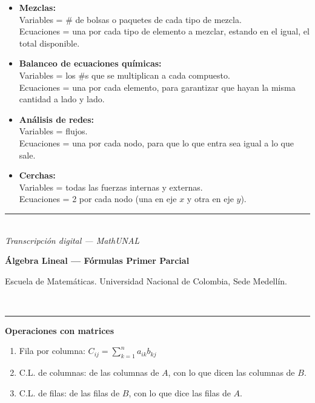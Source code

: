 \documentclass[11pt]{article}
\newcommand{\examheader}{%
  \noindent
  \begin{minipage}[t]{0.6\linewidth}
    {\small\bfseries Álgebra Lineal --- Fórmulas Primer Parcial}\\
  \end{minipage}%
  \hfill
  \begin{minipage}[t]{0.35\linewidth}
    \raggedleft\small Escuela de Matemáticas. Universidad Nacional de Colombia, Sede Medellín.
  \end{minipage}\\[2pt]
  \rule{\linewidth}{0.6pt}
}
\newcommand{\examfooter}{%
  \vfill
  \rule{\linewidth}{0.4pt}\\[1pt]
  {\scriptsize\textit{Transcripción digital --- MathUNAL}\hfill\textcolor{unalblue}{\textbf{\thepage}}}
}
\begin{document}
\begin{itemize}[leftmargin=1.2em]
\item \textbf{Mezclas:}\\
Variables = \# de bolsas o paquetes de cada tipo de mezcla.\\
Ecuaciones = una por cada tipo de elemento a mezclar, estando en el igual, el total disponible.

\vspace{0.2cm}
\item \textbf{Balanceo de ecuaciones químicas:}\\
Variables = los \#s que se multiplican a cada compuesto.\\
Ecuaciones = una por cada elemento, para garantizar que hayan la misma cantidad a lado y lado.

\vspace{0.2cm}
\item \textbf{Análisis de redes:}\\
Variables = flujos.\\
Ecuaciones = una por cada nodo, para que lo que entra sea igual a lo que sale.

\vspace{0.2cm}
\item \textbf{Cerchas:}\\
Variables = todas las fuerzas internas y externas.\\
Ecuaciones = 2 por cada nodo (una en eje $x$ y otra en eje $y$).
\end{itemize}

\examfooter
\newpage

\examheader

\begin{center}
{\bfseries\large Operaciones con matrices}
\end{center}

\begin{enumerate}
\item Fila por columna: $C_{ij} = \displaystyle\sum_{k=1}^{n} a_{ik}b_{kj}$
\item C.L. de columnas: de las columnas de $A$, con lo que dicen las columnas de $B$.
\item C.L. de filas: de las filas de $B$, con lo que dice las filas de $A$.
\end{enumerate}
\end{document}
